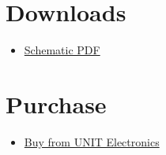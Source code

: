 \documentclass[10pt]{article}
\begin{document}
\section*{Downloads}
\begin{itemize}
\begin{itemize}
\item \href{docs/schematic.pdf}{Schematic PDF}
\end{itemize}
\end{itemize}

\section*{Purchase}
\begin{itemize}
\item \href{https://www.uelectronics.com}{Buy from UNIT Electronics}
\end{itemize}
\end{document}
